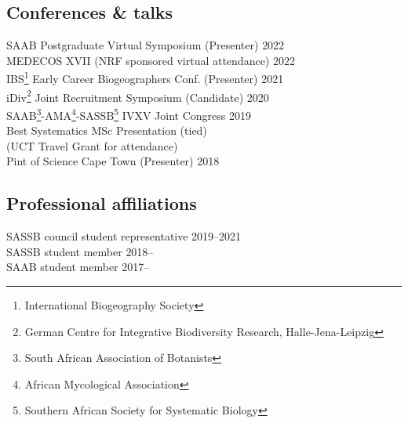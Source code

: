 \documentclass[10pt]{article}
\begin{document}
\begin{multicols}{2}
\subsection*{Conferences \& talks} %

SAAB Postgraduate Virtual Symposium {\small (Presenter)}  \hfill {\small 2022} \\
MEDECOS XVII                        {\small (NRF sponsored virtual attendance)}
                                                          \hfill {\small 2022} \\
IBS\footnote{
    International Biogeography Society}
  Early Career Biogeographers Conf. {\small (Presenter)}  \hfill {\small 2021} \\
iDiv\footnote{
    German Centre for Integrative Biodiversity Research, Halle-Jena-Leipzig}
  Joint Recruitment Symposium       {\small (Candidate)}  \hfill {\small 2020} \\
SAAB\footnote{
    South African Association of Botanists}-AMA\footnote{
      African Mycological Association}-SASSB\footnote{
        Southern African Society for Systematic Biology}
  IVXV Joint Congress                                     \hfill {\small 2019} \\
  \hspace{2em} {\small Best Systematics MSc Presentation (tied)}               \\
  \hspace{2em} {\small (UCT Travel Grant for attendance)}                      \\
Pint of Science Cape Town           {\small (Presenter)}  \hfill {\small 2018}

\subsection*{Professional affiliations} %

SASSB council student representative   \hfill {\small 2019--2021            } \\
SASSB student member                   \hfill {\small 2018--\hspace*{2.25em}} \\
SAAB student member                    \hfill {\small 2017--\hspace*{2.25em}}

\end{multicols} %
\end{document}
